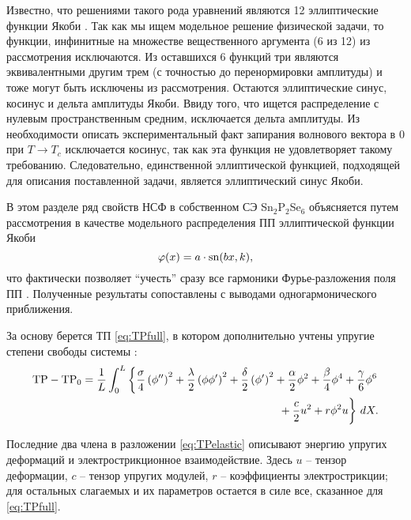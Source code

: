 Известно, что решениями такого рода уравнений являются 12 эллиптические функции Якоби \cite{Korn1973}. 
Так как мы ищем модельное решение физической задачи, то функции, инфинитные на множестве вещественного аргумента (6 из 12) из рассмотрения исключаются. 
Из оставшихся 6 функций три являются эквивалентными другим трем (с точностью до перенормировки амплитуды) и тоже могут быть исключены из рассмотрения. 
Остаются эллиптические синус, косинус и дельта амплитуды Якоби. 
Ввиду того, что ищется распределение с нулевым пространственным средним, исключается дельта амплитуды. 
Из необходимости описать экспериментальный факт запирания волнового вектора в 0 при $T\rightarrow T_c$ исключается косинус, так как эта функция не удовлетворяет такому требованию. 
Следовательно, единственной эллиптической функцией, подходящей для описания поставленной задачи, является эллиптический синус Якоби.

В этом разделе ряд свойств НСФ в собственном СЭ Sn$_2$P$_2$Se$_6$ объясняется путем рассмотрения в качестве модельного распределения ПП эллиптической функции Якоби 
\begin{equation}
\varphi(x) = a \cdot \operatorname{sn}(bx, k),
\label{eq:snmodel}
\end{equation}
что фактически позволяет ``учесть'' сразу все гармоники Фурье-разложения поля ПП \cite{Berezovsky1998}. 
Полученные результаты сопоставлены с выводами одногармонического приближения.

За основу берется ТП \eqref{eq:TPfull}, в котором дополнительно учтены упругие степени свободы системы \cite{Vysochanskii1994, Vysochanskii1990, Ema1990}:
\begin{equation}\label{eq:TPelastic}
\begin{aligned}
\mathrm{TP} - \mathrm{TP}_0 = \frac{1}{L}
 	                      \int^L_0 \left\{\frac{\sigma}{4} \left( \phi'' \right)^2 + 
 	                      \frac{\lambda}{2}\left(\phi\phi'\right)^2 + 
 	                      \frac{\delta}{2}\left(\phi'\right)^2 
 	                      + \frac{\alpha}{2}\phi^2 + \frac{\beta}{4}\phi^4 + 
 	                      \frac{\gamma}{6}\phi^6 \right.\\
 	                      \left. \vphantom{\frac{\lambda}{2}} 
 	                      + \frac{c}{2}u^2 + r\phi^2 u \right\}\,dX.
\end{aligned}
\end{equation}

Последние два члена в разложении \eqref{eq:TPelastic} описывают энергию упругих деформаций и электрострикционное взаимодействие. Здесь $u$ -- тензор деформации, $c$ -- тензор упругих модулей, $r$ -- коэффициенты электрострикции; для остальных слагаемых и их параметров остается в силе все, сказанное для \eqref{eq:TPfull}.

